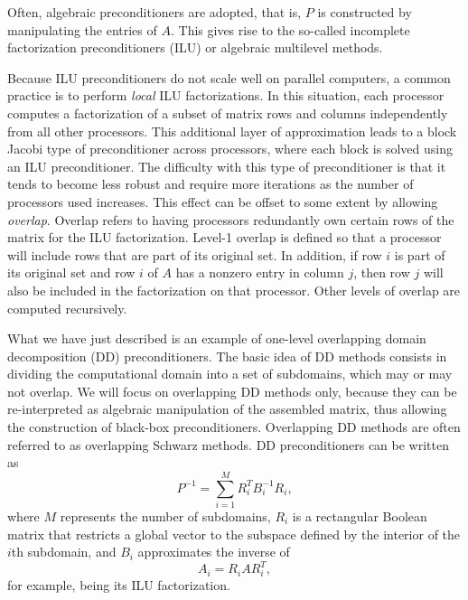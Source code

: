 \documentclass[10pt,relax]{SANDreport}
\begin{document}
\smallskip

Often, algebraic preconditioners are adopted, that is, $P$ is constructed by
manipulating the entries of $A$. This gives rise to the so-called incomplete
factorization preconditioners (ILU) or algebraic multilevel methods. 

Because ILU preconditioners do not scale well on parallel computers, a common
practice is to perform {\em local} ILU factorizations.  In this situation,
each processor computes a factorization of a subset of matrix rows and
columns independently from all other processors.  This additional layer of
approximation leads to a block Jacobi type of preconditioner across
processors, where each block is solved using an ILU preconditioner.  The
difficulty with this type of preconditioner is that it tends to become less
robust and require more iterations as the number of processors used
increases.  This effect can be offset to some extent by allowing {\em
overlap}.  Overlap refers to having processors redundantly own certain
rows of the matrix for the ILU factorization.  Level-1 overlap is defined
so that a processor will include rows that are part of its original set.
In addition, if row $i$ is part of its original set and row $i$ of $A$ has
a nonzero entry in column $j$, then row $j$ will also be included in the
factorization on that processor.  Other levels of overlap are computed
recursively. 

What we have just described is an example of one-level overlapping domain
decomposition (DD) preconditioners.  The basic idea of DD methods consists in
dividing the computational domain into a set of subdomains, which may or may
not overlap. We will focus on overlapping DD methods only, because they can be
re-interpreted as algebraic manipulation of the assembled matrix, thus
allowing the construction of black-box preconditioners. Overlapping DD methods
are often referred to as overlapping Schwarz methods. DD preconditioners can
be written as
\begin{equation}
  \label{eq:prec_dd}
  P^{-1} = \sum_{i=1}^M R_i^T B_i^{-1} R_i,
\end{equation}
where $M$ represents the number of subdomains,
$R_i$ is a rectangular Boolean matrix that restricts
a global vector to the subspace defined by the interior of the $i$th
subdomain, and $B_i$ approximates the inverse of 
\begin{equation}
  \label{eq:aztecoo_tilde_a}
  A_i = R_i A R_i^T ,
\end{equation}
for example, being its ILU factorization.
\end{document}
